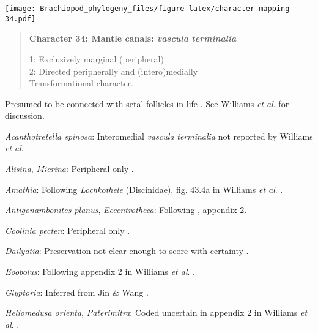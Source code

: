 \documentclass[openany]{book}
\theoremstyle{definition}
\theoremstyle{definition}
\theoremstyle{definition}
\theoremstyle{remark}
\begin{document}
\texttt{[image: Brachiopod\_phylogeny\_files/figure-latex/character-mapping-34.pdf]}

\begin{quote}
\textbf{Character 34: Mantle canals: \emph{vascula} \emph{terminalia}}

1: Exclusively marginal (peripheral)\\
2: Directed peripherally and (intero)medially\\
Transformational character.
\end{quote}

Presumed to be connected with setal follicles in life
\citep{Williams1998Thediversity}. See Williams \emph{et al}.
\citeyearpar{Williams2000LinguliformeaCraniiformea} for discussion.

\hypertarget{Acanthotretella_spinosa-coding-34}{}
\emph{Acanthotretella spinosa}: Interomedial \emph{vascula}
\emph{terminalia} not reported by Williams \emph{et al}.
\citeyearpar{Williams2000LinguliformeaCraniiformea}.

\hypertarget{Alisina-coding-34}{}
\emph{Alisina}, \emph{Micrina}: Peripheral only
\citep{Williams1998Thediversity, Williams2000LinguliformeaCraniiformea}.

\hypertarget{Amathia-coding-34}{}
\emph{Amathia}: Following \emph{Lochkothele} (Discinidae), fig. 43.4a in
Williams \emph{et al}.
\citeyearpar{Williams2000LinguliformeaCraniiformea}.

\hypertarget{Antigonambonites_planus-coding-34}{}
\emph{Antigonambonites planus}, \emph{Eccentrotheca}: Following
\citet{Williams1998Thediversity}, appendix 2.

\hypertarget{Coolinia_pecten-coding-34}{}
\emph{Coolinia pecten}: Peripheral only
\citep[p.158]{Williams2000LinguliformeaCraniiformea}.

\hypertarget{Dailyatia-coding-34}{}
\emph{Dailyatia}: Preservation not clear enough to score with certainty
\citep{Holmer2006Aspinose}.

\hypertarget{Eoobolus-coding-34}{}
\emph{Eoobolus}: Following appendix 2 in Williams \emph{et al}.
\citeyearpar{Williams1998Thediversity}.

\hypertarget{Glyptoria-coding-34}{}
\emph{Glyptoria}: Inferred from Jin \& Wang
\citeyearpar{Jin1992Revisionof}.

\hypertarget{Heliomedusa_orienta-coding-34}{}
\emph{Heliomedusa orienta}, \emph{Paterimitra}: Coded uncertain in
appendix 2 in Williams \emph{et al}.
\citeyearpar{Williams1998Thediversity}.
\end{document}
